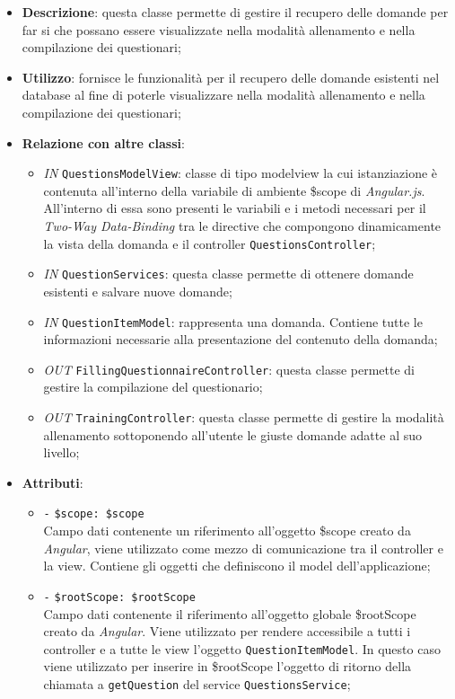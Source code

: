 \begin{itemize}
	\item \textbf{Descrizione}: questa classe permette di gestire il recupero delle domande per far si che possano essere visualizzate nella modalità allenamento e nella compilazione dei questionari;
	\item \textbf{Utilizzo}: fornisce le funzionalità per il recupero delle domande esistenti nel database al fine di poterle visualizzare nella modalità allenamento e nella compilazione dei questionari;
	\item \textbf{Relazione con altre classi}:
	\begin{itemize}
		\item \textit{IN} \texttt{QuestionsModelView}: classe di tipo modelview la cui istanziazione è contenuta all'interno della variabile di ambiente \$scope di \textit{Angular.js}. All'interno di essa sono presenti le variabili e i metodi necessari per il \textit{Two-Way Data-Binding} tra le directive che compongono dinamicamente la vista della domanda e il controller \texttt{QuestionsController};
		\item \textit{IN} \texttt{QuestionServices}: questa classe permette di ottenere domande esistenti e salvare nuove domande;
		\item \textit{IN} \texttt{QuestionItemModel}: rappresenta una domanda. Contiene tutte le informazioni necessarie alla presentazione del contenuto della domanda;
		\item \textit{OUT} \texttt{FillingQuestionnaireController}: questa classe permette di gestire la compilazione del questionario;
		\item \textit{OUT} \texttt{TrainingController}: questa classe permette di gestire la modalità allenamento sottoponendo all'utente le giuste domande adatte al suo livello;
	\end{itemize}
	\item \textbf{Attributi}:
	\begin{itemize}
		\item \texttt{-} \texttt{\$scope: \$scope} \\
		Campo dati contenente un riferimento all’oggetto \$scope creato da \textit{Angular}, viene utilizzato come mezzo di comunicazione tra il controller e la view. Contiene gli oggetti che definiscono il model dell’applicazione;
		\item \texttt{-} \texttt{\$rootScope: \$rootScope} \\
		Campo dati contenente il riferimento all'oggetto globale \$rootScope creato da \textit{Angular}. Viene utilizzato per rendere accessibile a tutti i controller e a tutte le view l'oggetto \texttt{QuestionItemModel}. In questo caso viene utilizzato per inserire in \$rootScope l'oggetto di ritorno della chiamata a \texttt{getQuestion} del service \texttt{QuestionsService};

\end{itemize}
\end{itemize}
